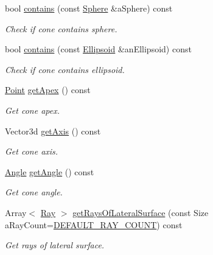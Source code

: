 \begin{DoxyCompactItemize}
bool \hyperlink{classostk_1_1math_1_1geom_1_1d3_1_1objects_1_1_cone_af5c0e153db61bc978038e8fbbc107844}{contains} (const \hyperlink{classostk_1_1math_1_1geom_1_1d3_1_1objects_1_1_sphere}{Sphere} \&a\+Sphere) const
\begin{DoxyCompactList}\small\item\em Check if cone contains sphere. \end{DoxyCompactList}\item 
bool \hyperlink{classostk_1_1math_1_1geom_1_1d3_1_1objects_1_1_cone_a2305330aab422c044ff6a05b5b36101c}{contains} (const \hyperlink{classostk_1_1math_1_1geom_1_1d3_1_1objects_1_1_ellipsoid}{Ellipsoid} \&an\+Ellipsoid) const
\begin{DoxyCompactList}\small\item\em Check if cone contains ellipsoid. \end{DoxyCompactList}\item 
\hyperlink{classostk_1_1math_1_1geom_1_1d3_1_1objects_1_1_point}{Point} \hyperlink{classostk_1_1math_1_1geom_1_1d3_1_1objects_1_1_cone_acc452d4c78df49bf3f15c840d6e15c1f}{get\+Apex} () const
\begin{DoxyCompactList}\small\item\em Get cone apex. \end{DoxyCompactList}\item 
Vector3d \hyperlink{classostk_1_1math_1_1geom_1_1d3_1_1objects_1_1_cone_a061a6572fea78dcd22b4466a57bd1b6b}{get\+Axis} () const
\begin{DoxyCompactList}\small\item\em Get cone axis. \end{DoxyCompactList}\item 
\hyperlink{classostk_1_1math_1_1geom_1_1_angle}{Angle} \hyperlink{classostk_1_1math_1_1geom_1_1d3_1_1objects_1_1_cone_ac288545383fe1514951ce13f1e7611f3}{get\+Angle} () const
\begin{DoxyCompactList}\small\item\em Get cone angle. \end{DoxyCompactList}\item 
Array$<$ \hyperlink{classostk_1_1math_1_1geom_1_1d3_1_1objects_1_1_ray}{Ray} $>$ \hyperlink{classostk_1_1math_1_1geom_1_1d3_1_1objects_1_1_cone_a8dc14bb0164c5bf0b2525aaa4c52ea5a}{get\+Rays\+Of\+Lateral\+Surface} (const Size a\+Ray\+Count=\hyperlink{_cone_8hpp_a95759f940e1d5e70e977d66fa8fcb5ec}{D\+E\+F\+A\+U\+L\+T\+\_\+\+R\+A\+Y\+\_\+\+C\+O\+U\+NT}) const
\begin{DoxyCompactList}\small\item\em Get rays of lateral surface. \end{DoxyCompactList}\item 

\end{DoxyCompactItemize}
